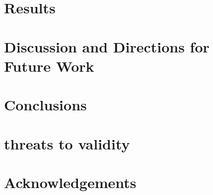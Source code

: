 \documentclass[sigconf]{acmart}
\begin{document}
\section{Results}
\section{Discussion and Directions for Future Work}
\section{Conclusions}
\section*{threats to validity}


\section*{Acknowledgements}



\begin{thebibliography}{9}

\end{thebibliography}
\end{document}
